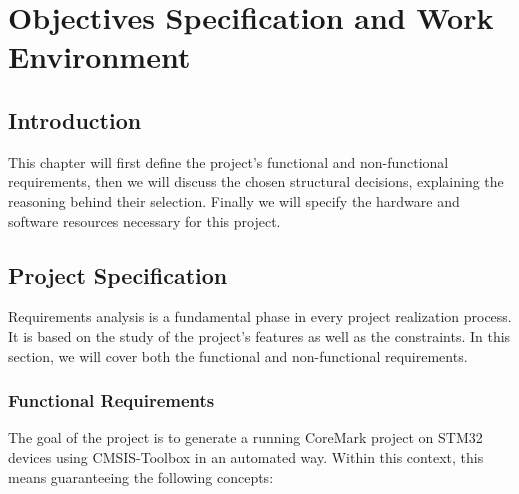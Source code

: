 \chapter{Objectives Specification and Work Environment}

\section*{Introduction}
This chapter will first define the project's functional and non-functional requirements, then we will discuss the chosen structural decisions, explaining the reasoning behind their selection. Finally we will specify the hardware and software resources necessary for this project.

\section{Project Specification}
Requirements analysis is a fundamental phase in every project realization process. It is based on the study of the project's features as well as the constraints. In this section, we will cover both the functional and non-functional requirements.

\subsection{Functional Requirements}

The goal of the project is to generate a running CoreMark project on STM32 devices using CMSIS-Toolbox in an automated way. Within this context, this means guaranteeing the following concepts:

%

